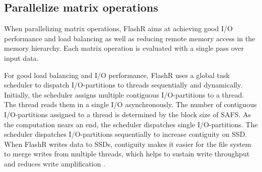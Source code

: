
\subsection{Parallelize matrix operations}

When parallelizing matrix operations, FlashR aims at achieving
good I/O performance and load balancing as well as reducing remote memory access
in the memory hierarchy. Each matrix operation is evaluated with
a single pass over input data.

For good load balancing and I/O performance, FlashR uses a global task scheduler
to dispatch I/O-partitions to threads sequentially and dynamically. Initially,
the scheduler assigns
multiple contiguous I/O-partitions to a thread. The thread reads them in
a single I/O asynchronously. The number of contiguous I/O-partitions
assigned to a thread is determined by the block size of SAFS.
As the computation nears an end, the scheduler dispatches single I/O-partitions. 
The scheduler dispatches I/O-partitions sequentially to increase contiguity
on SSD. When FlashR writes data to SSDs,
contiguity makes it easier for the file system to merge
writes from multiple threads, which helps to sustain write throughput and reduces
write amplification \cite{ripq}.


